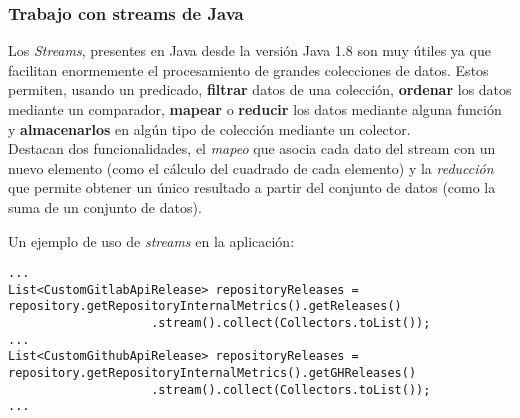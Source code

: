 %

\subsubsection{Trabajo con streams de Java}

Los \textit{Streams}, presentes en Java desde la versión Java 1.8 son muy útiles ya que facilitan enormemente el procesamiento de grandes colecciones de datos. Estos permiten, usando un predicado, \textbf{filtrar} datos de una colección, \textbf{ordenar} los datos mediante un comparador, \textbf{mapear} o \textbf{reducir} los datos mediante alguna función y \textbf{almacenarlos} en algún tipo de colección mediante un colector. \\ 
Destacan dos funcionalidades, el \textit{mapeo} que asocia cada dato del stream con un nuevo elemento (como el cálculo del cuadrado de cada elemento) y la \textit{reducción} que permite obtener un único resultado a partir del conjunto de datos (como la suma de un conjunto de datos).

Un ejemplo de uso de \textit{streams} en la aplicación:\\
\begin{minipage}{\linewidth}
{\tiny
\begin{verbatim}
...
List<CustomGitlabApiRelease> repositoryReleases = repository.getRepositoryInternalMetrics().getReleases()
					.stream().collect(Collectors.toList());
...
List<CustomGithubApiRelease> repositoryReleases = repository.getRepositoryInternalMetrics().getGHReleases()
					.stream().collect(Collectors.toList());
...
\end{verbatim}
}
\end{minipage}

